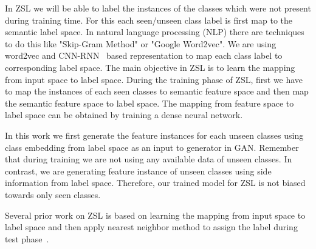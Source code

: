 \documentclass[11pt, conference, english]{IEEEtran}
\theoremstyle{plain}
\theoremstyle{definition}
\theoremstyle{remark}
\begin{document}
	
	In ZSL we will be able to label the instances of the classes which were not present during training time. For this each seen/unseen class label is first map to the semantic label space. In natural language processing (NLP) there are techniques to do this like "Skip-Gram Method" or "Google Word2vec". We are using word2vec and CNN-RNN~\cite{scott2016CVPR} based representation to  map each class label to corresponding label space. The main objective in ZSL is to learn the mapping from input space to label space. During the training phase of ZSL, first we have to map the instances of each seen classes to semantic feature space and then map the semantic feature space to label space. The mapping from feature space to label space can be obtained by training a dense neural network.
	
	In this work we first generate the feature instances for each unseen classes using class embedding from label space as an input to generator in GAN. Remember that during training we are not using any available  data of unseen classes. In contrast, we are generating feature instance of unseen classes using side information from label space. Therefore, our trained model for ZSL is not biased towards only seen classes.
	
	Several prior work on ZSL is based on learning the mapping from input space to label space and then apply nearest neighbor method to assign the label during test phase~\cite{frome2013devise,lake2011one}. 
\end{document}
